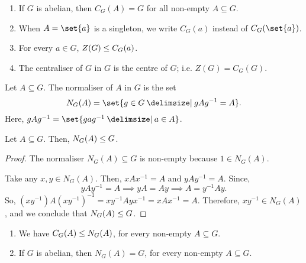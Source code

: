 \documentclass[11pt]{penrose}
\begin{document}
\begin{remark}\phantom{}
    \begin{enumerate}
        \item If $G$ is abelian, then $C_{G}(A) = G$ for all non-empty $A \subseteq G$.
        \item When $A = \set{a}$ is a singleton, we write $C_{G}(a)$ instead of $C_{G}(\set{a})$.
        \item For every $a \in G$, $Z(G) \mathrel{\leq} C_{G}(a)$.
        \item The centraliser of $G$ in $G$ is the centre of $G$; i.e. $Z(G) = C_{G}(G)$.
    \end{enumerate}
\end{remark}

\begin{ndfn}
    Let $A \subseteq G$. The normaliser of $A$ in $G$ is the set
    \begin{equation*}
        N_{G}(A) = \set{ g \in G \st g A g^{-1} = A}.
    \end{equation*}
    Here, $g A g^{-1} = \set{g a g^{-1} \st a \in A}$.
\end{ndfn}

\begin{nprop}
    Let $A \subseteq G$. Then, $N_{G}(A) \mathrel{\leq} G$.
\end{nprop}
\begin{proof}
    The normaliser $N_{G}(A) \subseteq G$ is non-empty because $1 \in N_{G}(A)$.

    Take any $x, y \in N_{G}(A)$. Then, $xAx^{-1} = A$ and $yAy^{-1} = A$. Since,
    \begin{equation*}
        yAy^{-1} = A
        \implies
        yA = Ay
        \implies
        A = y^{-1}Ay.
    \end{equation*}
    So, $(xy^{-1}) A (xy^{-1})^{-1} = x y^{-1} A y x^{-1} = x A x^{-1} = A$. Therefore, $xy^{-1} \in N_{G}(A)$, and we conclude that $N_{G}(A) \mathrel{\leq} G$.
\end{proof}

\begin{remark}
    \phantom{}
    \begin{enumerate}
        \item We have $C_{G}(A) \mathrel{\leq} N_{G}(A)$, for every non-empty $A \subseteq G$.
        \item If $G$ is abelian, then $N_{G}(A) = G$, for every non-empty $A \subseteq G$.
    \end{enumerate}
\end{remark}
\end{document}

